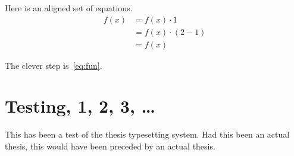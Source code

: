 \documentclass[ms,twoside,print]{nuthesis}
\begin{document}
Here is an aligned set of equations.
\begin{align}
f(x) &= f(x) \cdot 1 \\
     &= f(x) \cdot (2-1)\label{eq:fun}\\
     &= f(x)
\end{align}

The clever step is~\eqref{eq:fun}.

\chapter{Testing, 1, 2, 3, \ldots}

This has been a test of the thesis typesetting system.
Had this been an actual thesis, this would have been
preceded by an actual thesis.



\nocite{*}

\end{document}
